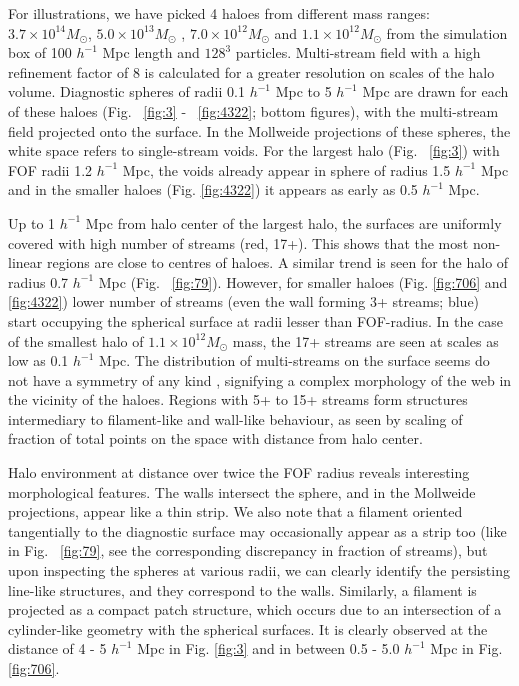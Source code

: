 For illustrations, we have picked 4 haloes from different mass ranges: $3.7 \times 10^{14}M_{\odot} $,  $5.0 \times 10^{13} M_{\odot} $ , $7.0 \times 10^{12} M_{\odot} $ and $1.1 \times 10^{12} M_{\odot} $ from the simulation box of 100 $h^{-1}$ Mpc length and $128^3$ particles. Multi-stream field with a high refinement factor of 8 is calculated for a greater resolution on scales of the halo volume. Diagnostic spheres of radii 0.1 $h^{-1}$ Mpc to 5 $h^{-1}$ Mpc are drawn for each of these haloes (Fig. ~\ref{fig:3} - ~\ref{fig:4322}; bottom figures), with the multi-stream field projected onto the surface. In the Mollweide projections of these spheres, the white space refers to single-stream voids. For the largest halo (Fig. ~\ref{fig:3}) with FOF radii 1.2 $h^{-1}$ Mpc, the voids already appear in sphere of radius 1.5 $h^{-1}$ Mpc and in the smaller haloes (Fig. \ref{fig:4322}) it appears as early as 0.5 $h^{-1}$ Mpc.  

Up to 1 $h^{-1}$ Mpc from halo center of the largest halo, the surfaces are uniformly covered with high number of streams (red, 17+). This shows that the most non-linear regions are close to centres of haloes. A similar trend is seen for the halo of radius 0.7 $h^{-1}$ Mpc (Fig. ~\ref{fig:79}). However, for smaller haloes (Fig. \ref{fig:706} and \ref{fig:4322}) lower number of streams (even the wall forming 3+ streams; blue) start occupying the spherical surface at radii lesser than FOF-radius. In the case of the smallest halo of $1.1 \times 10^{12} M_{\odot} $ mass, the 17+ streams are seen at scales as low as 0.1 $h^{-1}$ Mpc. The distribution of multi-streams on the surface seems do not have a symmetry of any kind , signifying a complex morphology of the web in the vicinity of the haloes. Regions with 5+ to 15+ streams form structures intermediary to filament-like and wall-like behaviour, as seen by scaling of fraction of total points on the space with distance from halo center.

Halo environment at distance over twice the FOF radius reveals interesting morphological features. The walls intersect the sphere, and in the 
Mollweide projections, appear like a thin strip. 
We also note that a filament oriented tangentially to the diagnostic surface may occasionally appear as a strip too (like in Fig. ~\ref{fig:79}, 
see the corresponding discrepancy in fraction of streams), but upon inspecting the spheres at various radii, we can clearly identify the persisting line-like structures, and they correspond to the walls. Similarly, a filament is projected as a compact patch structure, which occurs due to an intersection of a cylinder-like geometry with the spherical surfaces. It is clearly observed at the distance of 4 - 5 $h^{-1}$ Mpc in Fig. \ref{fig:3} and in between 0.5 - 5.0 $h^{-1}$ Mpc in Fig. \ref{fig:706}.
	
